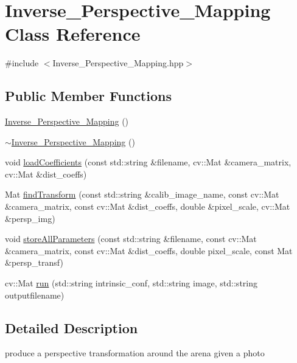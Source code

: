 \hypertarget{class_inverse___perspective___mapping}{}\section{Inverse\+\_\+\+Perspective\+\_\+\+Mapping Class Reference}
\label{class_inverse___perspective___mapping}


{\ttfamily \#include $<$Inverse\+\_\+\+Perspective\+\_\+\+Mapping.\+hpp$>$}

\subsection*{Public Member Functions}
\begin{DoxyCompactItemize}
\item 
\mbox{\hyperlink{class_inverse___perspective___mapping_a9c3733e22a6516e932a2197196c999f2}{Inverse\+\_\+\+Perspective\+\_\+\+Mapping}} ()
\item 
\mbox{\hyperlink{class_inverse___perspective___mapping_a9f1588ec3a84a4c664ae33c1fd3693df}{$\sim$\+Inverse\+\_\+\+Perspective\+\_\+\+Mapping}} ()
\item 
void \mbox{\hyperlink{class_inverse___perspective___mapping_a60f8dbac68fadb20b085bfbcef293480}{load\+Coefficients}} (const std\+::string \&filename, cv\+::\+Mat \&camera\+\_\+matrix, cv\+::\+Mat \&dist\+\_\+coeffs)
\item 
Mat \mbox{\hyperlink{class_inverse___perspective___mapping_aa4444fc0f5e10cab7f408d6679be73db}{find\+Transform}} (const std\+::string \&calib\+\_\+image\+\_\+name, const cv\+::\+Mat \&camera\+\_\+matrix, const cv\+::\+Mat \&dist\+\_\+coeffs, double \&pixel\+\_\+scale, cv\+::\+Mat \&persp\+\_\+img)
\item 
void \mbox{\hyperlink{class_inverse___perspective___mapping_abdea95329f3868f2a0875832a67f1076}{store\+All\+Parameters}} (const std\+::string \&filename, const cv\+::\+Mat \&camera\+\_\+matrix, const cv\+::\+Mat \&dist\+\_\+coeffs, double pixel\+\_\+scale, const Mat \&persp\+\_\+transf)
\item 
cv\+::\+Mat \mbox{\hyperlink{class_inverse___perspective___mapping_ad95385fefc56350a732760d7c68fe6a3}{run}} (std\+::string intrinsic\+\_\+conf, std\+::string image, std\+::string outputfilename)
\end{DoxyCompactItemize}


\subsection{Detailed Description}
produce a perspective transformation around the arena given a photo 

